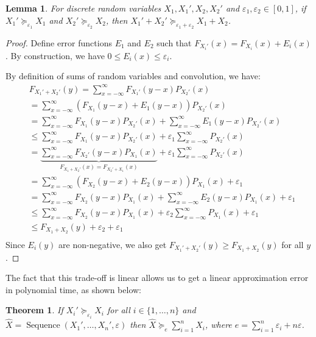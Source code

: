 \documentclass[review]{elsarticle}
\newtheorem{theorem}{Theorem}
\newtheorem{lemma}{Lemma}
\DeclareMathOperator{\Sequence}{Sequence}
\begin{document}
\begin{lemma} \label{Convolv}
For discrete random variables  $X_1,X_1',X_2,X_2'$ and $\varepsilon_1,\varepsilon_2 \in [0,1]$, 
if $X_1'\succeq_{\varepsilon_1} X_1$ and  $X_2'\succeq_{\varepsilon_2} X_2$,
then $X_1'+X_2'\succeq_{\varepsilon_1+\varepsilon_2} X_1+X_2$.
\end{lemma}

\begin{proof}
Define error functions $E_1$ and $E_2$ such that 
$F_{X_i'}(x) = F_{X_i}(x)+ E_i(x)$. By construction, we have $ 0 \leq E_i(x) \leq \varepsilon_i$.

By definition of sums of random variables and convolution, we have:
\begin{align*}
& F_{X_1'+X_2'}(y) = \sum_{x=-\infty}^{\infty}F_{X_1'}(y-x)P_{X_2'}(x)\\
&=\sum_{x=-\infty}^{\infty}(F_{X_1}(y-x)+E_1(y-x))P_{X_2'}(x)\\
&= \sum_{x=-\infty}^{\infty}F_{X_1}(y-x)P_{X_2'}(x)+\sum_{x=-\infty}^{\infty}E_1(y-x)P_{X_2'}(x)\\
&\leq\sum_{x=-\infty}^{\infty}F_{X_1}(y-x)P_{X_2'}(x)+\varepsilon_1\sum_{x=-\infty}^{\infty}P_{X_2'}(x)\\
&=\underbrace{\sum_{x=-\infty}^{\infty}F_{X_2'}(y-x)P_{X_1}(x)}_{F_{X_1+X_2'}(x)=F_{X_2'+X_1}(x)}+\varepsilon_1\sum_{x=-\infty}^{\infty}P_{X_2'}(x)\\
&=\sum_{x=-\infty}^{\infty}(F_{X_2}(y-x)+E_2(y-x))P_{X_1}(x) + \varepsilon_1\\
&=\sum_{x=-\infty}^{\infty}F_{X_2}(y-x)P_{X_1}(x)+\sum_{x=-\infty}^{\infty}E_2(y-x)P_{X_1}(x) + \varepsilon_1\\
&\leq\sum_{x=-\infty}^{\infty}F_{X_2}(y-x)P_{X_1}(x)+\varepsilon_2\sum_{x=-\infty}^{\infty}P_{X_1}(x) + \varepsilon_1\\
&\leq F_{X_1+X_2}(y)+\varepsilon_2 + \varepsilon_1\\
\end{align*}%
Since $E_i(y)$ are non-negative, we also get $F_{X_1'+X_2'}(y) \geq F_{X_1+X_2}(y)$ for all $y$.
\end{proof}

The fact that this trade-off is linear allows us to get a linear approximation error 
in polynomial time, as shown below:



\begin{theorem}
If $X_i' \succeq_{\varepsilon_i} X_i$ for all $i \in\{1,\dots,n\}$ and $\hat{X}= \Sequence(X_1',\dots,X_n', \varepsilon)$ then
$\hat{X} \succeq_e \sum_{i=1}^{n} X_{i}$, where $e={\sum_{i=1}^n\varepsilon_i + n \varepsilon}$. 
\label{appSeqTheorem}
\end{theorem} 
\end{document}
